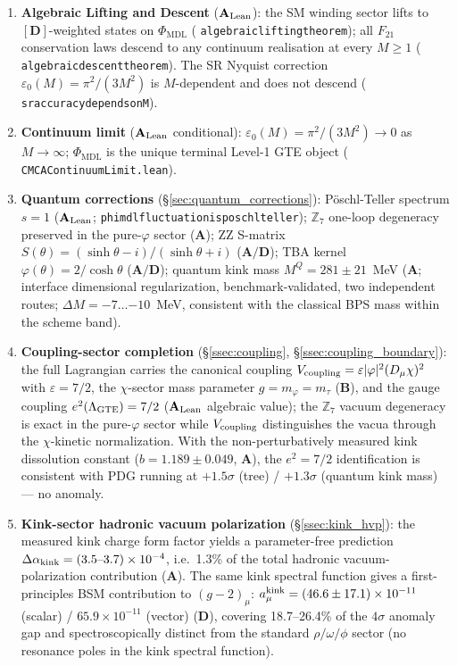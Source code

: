 \documentclass[11pt]{article}
\theoremstyle{remark}
\newcommand{\PHIMDL}{\Phi_{\mathrm{MDL}}}
\newcommand{\ZS}{\mathbb{Z}_7}
\newcommand{\lean}[1]{%
  \penalty-100
  \begingroup\def\_{\textunderscore\allowbreak}\texttt{#1}\endgroup}
\newcommand{\epsz}{\varepsilon_0}
\newcommand{\mtau}{m_\tau}
\newcommand{\CatA}{\textbf{A}}
\newcommand{\CatAL}{\ensuremath{\textbf{A}_{\rm Lean}}}
\newcommand{\CatAD}{\textbf{A/D}}
\newcommand{\CatB}{\textbf{B}}
\newcommand{\CatD}{\textbf{D}}
\begin{document}
\begin{enumerate}[noitemsep]
  \item \textbf{Algebraic Lifting and Descent} ($\CatAL$): the SM winding
    sector lifts to $[\mathbf{D}]$-weighted states on $\PHIMDL$
    (\lean{algebraic\_lifting\_theorem}); all $F_{21}$ conservation laws
    descend to any continuum realisation at every $M\geq1$
    (\lean{algebraic\_descent\_theorem}).  The SR Nyquist correction
    $\epsz(M)=\pi^2/(3M^2)$ is $M$-dependent and does not descend
    (\lean{sr\_accuracy\_depends\_on\_M}).

  \item \textbf{Continuum limit} ($\CatAL$ conditional):
    $\epsz(M)=\pi^2/(3M^2)\to 0$ as $M\to\infty$; $\PHIMDL$ is the unique
    terminal Level-1 GTE object (\lean{CMCAContinuumLimit.lean}).

  \item \textbf{Quantum corrections} (\S\ref{sec:quantum_corrections}):
    Pöschl-Teller spectrum $s=1$ ($\CatAL$; \lean{phimdl\_fluctuation\_is\_poschl\_teller});
    $\mathbb{Z}_7$ one-loop degeneracy preserved in the pure-$\varphi$ sector ($\CatA$);
    ZZ S-matrix $S(\theta)=(\sinh\theta-i)/(\sinh\theta+i)$ ($\CatAD$);
    TBA kernel $\varphi(\theta)=2/\cosh\theta$ ($\CatAD$);
    quantum kink mass $M^Q = 281 \pm 21$~MeV ($\CatA$; interface dimensional
    regularization, benchmark-validated, two independent routes;
    $\Delta M = -7\ldots{-10}$~MeV, consistent with the classical BPS mass
    within the scheme band).

  \item \textbf{Coupling-sector completion} (\S\ref{ssec:coupling},
    \S\ref{ssec:coupling_boundary}): the full Lagrangian carries the canonical
    coupling $V_{\rm coupling}=\varepsilon|\varphi|^2(D_\mu\chi)^2$ with
    $\varepsilon = 7/2$, the $\chi$-sector mass parameter $g = m_\varphi = \mtau$
    ($\CatB$), and the gauge coupling $e^2(\Lambda_{\rm GTE}) = 7/2$ ($\CatAL$
    algebraic value); the $\ZS$ vacuum degeneracy is exact in the
    pure-$\varphi$ sector while $V_{\rm coupling}$ distinguishes the vacua
    through the $\chi$-kinetic normalization.  With the non-perturbatively
    measured kink dissolution constant ($b = 1.189 \pm 0.049$, $\CatA$), the
    $e^2 = 7/2$ identification is consistent with PDG running at
    $+1.5\sigma$ (tree) / $+1.3\sigma$ (quantum kink mass) --- no anomaly.

  \item \textbf{Kink-sector hadronic vacuum polarization}
    (\S\ref{ssec:kink_hvp}): the measured kink charge form factor yields a
    parameter-free prediction
    $\Delta\alpha_{\rm kink} = (3.5\text{--}3.7)\times10^{-4}$, i.e.\
    1.3\% of the total hadronic vacuum-polarization contribution ($\CatA$).
    The same kink spectral function gives a first-principles BSM contribution
    to $(g-2)_\mu$: $a_\mu^{\rm kink} = (46.6\pm17.1)\times10^{-11}$ (scalar)
    / $65.9\times10^{-11}$ (vector) ($\CatD$), covering 18.7--26.4\% of the
    $4\sigma$ anomaly gap and spectroscopically distinct from the standard
    $\rho/\omega/\phi$ sector (no resonance poles in the kink spectral function).
\end{enumerate}
\end{document}
